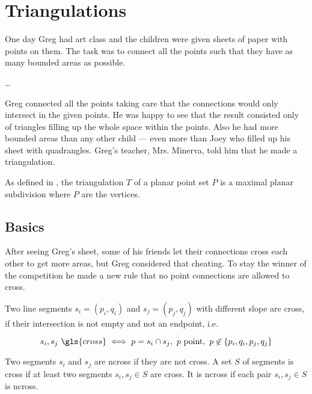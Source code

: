 \chapter{Triangulations}\label{cha:triangulations}
One day Greg had art class and the children were given sheets of
paper with points on them. The task was to connect all the points 
such that they have as many bounded areas as possible. 

\begin{definition}
  \ldots{}
\end{definition}

Greg 
connected all the points taking care that the connections would only 
intersect in the given points. He was happy to see that the result 
consisted only of triangles filling up the whole space within the 
points. Also he had more bounded areas than any other child --- 
even more than Joey who filled up his sheet with quadrangles. Greg's
teacher, Mrs. Minerva, told him that he made a triangulation.

\begin{definition}[Triangulation]\label{def:triangulation_subdivision}
As defined in \cite[Section 9.1]{deberg_compgeom}, the
triangulation \(T\) of a planar point set \(P\) is a maximal planar 
subdivision where \(P\) are the vertices.
\end{definition}

\section{Basics}
After seeing Greg's sheet, some of his friends let their connections
cross each other to get more areas, but Greg considered that
cheating. To stay the winner of the competition he made a new rule
that no point connections are allowed to cross.

\begin{definition}[Crossing]\label{def:crossing}
Two line segments \(s_i=(p_i,q_i)\) and \(s_j=(p_j,q_j)\) with 
different slope are \gls{cross}, if their intersection is not empty
and not an endpoint, i.e.

\[
  s_i, s_j~\gls{cross}
  \iff
  p = s_i\cap s_j,~
  p~\text{point},~
  p \not\in \{p_i,q_i,p_j,q_j\} \]

Two segments \(s_i\) and \(s_j\) are \gls{ncross} if they are
not \gls{cross}. A set \(S\) of segments is \gls{cross} if at least
two segments \(s_i, s_j \in S\) are \gls{cross}. It is \gls{ncross}
if each pair \(s_i, s_j \in S\) is \gls{ncross}.
\end{definition}

